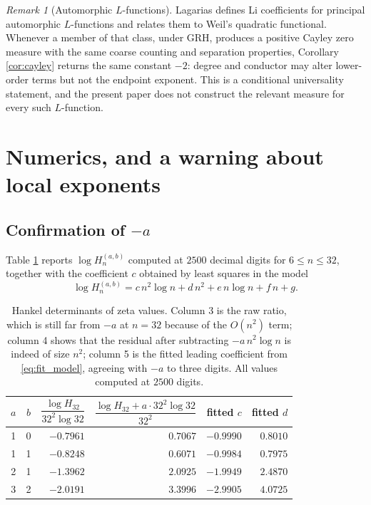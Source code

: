\documentclass[11pt]{amsart}
\numberwithin{equation}{section}
\theoremstyle{plain}
\theoremstyle{definition}
\theoremstyle{remark}
\newtheorem{remark}[theorem]{Remark}
\begin{document}
\begin{remark}[Automorphic $L$-functions]
Lagarias \cite{Lagarias2007} defines Li coefficients for principal automorphic $L$-functions and
relates them to Weil's quadratic functional. Whenever a member of that class, under GRH, produces a
positive Cayley zero measure with the same coarse counting and separation properties, Corollary
\ref{cor:cayley} returns the same constant $-2$: degree and conductor may alter lower-order terms
but not the endpoint exponent. This is a conditional universality statement, and the present paper
does not construct the relevant measure for every such $L$-function.
\end{remark}

\section{Numerics, and a warning about local exponents}
\label{sec:numerics}

\subsection{Confirmation of $-a$}

Table \ref{tab:zeta} reports $\log H_{n}^{(a,b)}$ computed at $2500$ decimal digits for
$6\le n\le32$, together with the coefficient $c$ obtained by least squares in the model
\begin{equation}
\log H_{n}^{(a,b)}=c\,n^{2}\log n+d\,n^{2}+e\,n\log n+f\,n+g .
\label{eq:fit_model}
\end{equation}

\begin{table}[htbp]
\centering
\begin{tabular}{ccrrrr}
\toprule
$a$ & $b$ & $\dfrac{\log H_{32}}{32^{2}\log32}$ & $\dfrac{\log H_{32}+a\cdot32^{2}\log32}{32^{2}}$ & fitted $c$ & fitted $d$\\
\midrule
1 & 0 & $-0.7961$ & $0.7067$ & $-0.9990$ & $0.8010$\\
1 & 1 & $-0.8248$ & $0.6071$ & $-0.9984$ & $0.7975$\\
2 & 1 & $-1.3962$ & $2.0925$ & $-1.9949$ & $2.4870$\\
3 & 2 & $-2.0191$ & $3.3996$ & $-2.9905$ & $4.0725$\\
\bottomrule
\end{tabular}
\caption{Hankel determinants of zeta values. Column 3 is the raw ratio, which is
still far from $-a$ at $n=32$ because of the $O(n^{2})$ term; column 4 shows that the residual
after subtracting $-a\,n^{2}\log n$ is indeed of size $n^{2}$; column 5 is the fitted leading
coefficient from \eqref{eq:fit_model}, agreeing with $-a$ to three digits. All values computed at
$2500$ digits.}
\label{tab:zeta}
\end{table}
\end{document}
